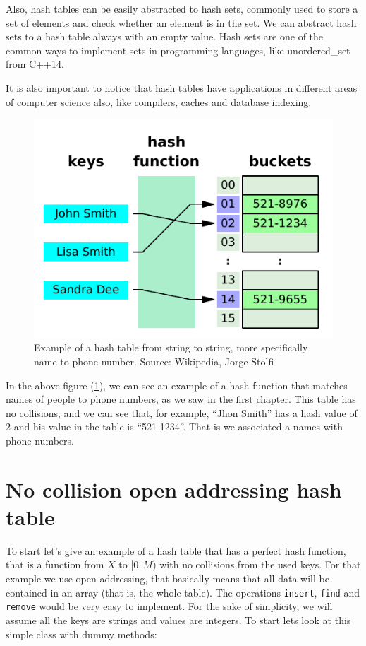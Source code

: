\newpage

Also, hash tables can be easily abstracted to hash sets, commonly used to store a set of elements and check whether an element is in the set. We can abstract hash sets to a hash table always with an empty value. Hash sets are one of the common ways to implement sets in programming languages, like unordered\_set from C++14.

It is also important to notice that hash tables have applications in different areas of computer science also, like compilers, caches and database indexing.


\begin{figure}[h!]
  \centering
  \includegraphics[width=12cm]{figuras/hash-table.pdf}
  \caption{Example of a hash table from string to string, more specifically name to phone number. Source: Wikipedia, Jorge Stolfi }
  \label{fig:hashTable}
\end{figure}

In the above figure (\ref{fig:hashTable}), we can see an example of a hash function that matches names of people to phone numbers, as we saw in the first chapter. This table has no collisions, and we can see that, for example, ``Jhon Smith'' has a hash value of 2 and his value in the table is ``521-1234''. That is we associated a names with phone numbers.

\newpage

\section{No collision open addressing hash table }

To start let's give an example of a hash table that has a perfect hash function, that is a function from \( X \) to \( [0, M) \) with no collisions from the used keys. For that example we use open addressing, that basically means that all data will be contained in an array (that is, the whole table). The operations \texttt{insert}, \texttt{find} and \texttt{remove} would be very easy to implement. For the sake of simplicity, we will assume all the keys are strings and values are integers. To start lets look at this simple class with dummy methods:


